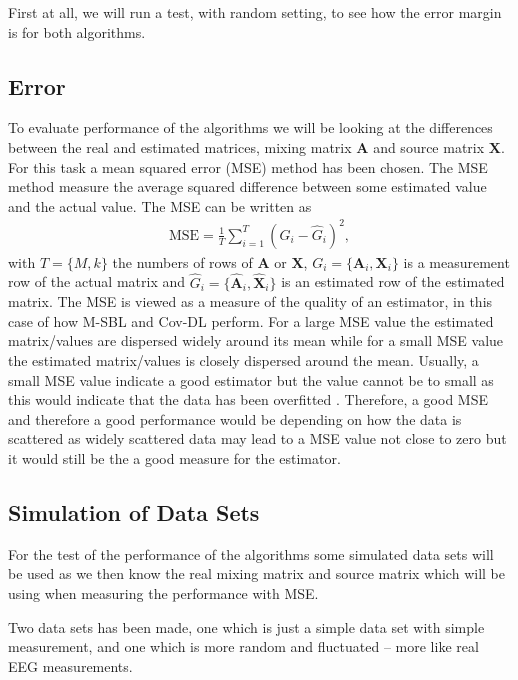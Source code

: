 First at all, we will run a test, with random setting, to see how the error margin is for both algorithms.

\subsection{Error}
To evaluate performance of the algorithms we will be looking at the differences between the real and estimated matrices, mixing matrix $\mathbf{A}$ and source matrix $\mathbf{X}$.
For this task a mean squared error (MSE) method has been chosen. 
The MSE method measure the average squared difference between some estimated value and the actual value. 
The MSE can be written as
\begin{align*}
\text{MSE} = \frac{1}{T} \sum_{i=1}^T (G_i - \hat{G}_i)^2,  
\end{align*}
with $T = \{M, k\}$ the numbers of rows of $\mathbf{A}$ or $\mathbf{X}$, $G_i = \{ \mathbf{A}_i, \mathbf{X}_i\}$ is a measurement row of the actual matrix and $\hat{G}_i = \{\hat{\mathbf{A}}_i,\hat{\mathbf{X}}_i\}$ is an estimated row of the estimated matrix.
The MSE is viewed as a measure of the quality of an estimator, in this case of how M-SBL and Cov-DL perform. 
For a large MSE value the estimated matrix/values are dispersed widely around its mean while for a small MSE value the estimated matrix/values is closely dispersed around the mean. 
Usually, a small MSE value indicate a good estimator but the value cannot be to small as this would indicate that the data has been overfitted . 
Therefore, a good MSE and therefore a good performance would be depending on how the data is scattered as widely scattered data may lead to a MSE value not close to zero but it would still be the a good measure for the estimator.

\subsection{Simulation of Data Sets}
For the test of the performance of the algorithms some simulated data sets will be used as we then know the real mixing matrix and source matrix which will be using when measuring the performance with MSE.

Two data sets has been made, one which is just a simple data set with simple measurement, and one which is more random and fluctuated -- more like real EEG measurements.

